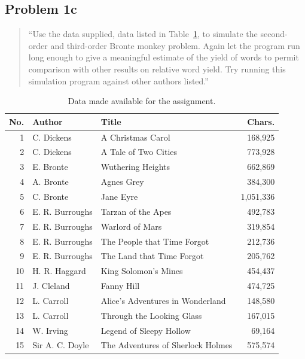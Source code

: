 \documentclass[conference]{IEEEtran}
\begin{document}
\subsection{Problem 1c}
\label{sec:problem1c}

\begin{quote}
``Use the data supplied, data listed in Table~\ref{tab:data}, to simulate the 
second-order and third-order Bronte monkey problem. Again let the program run 
long enough to give a meaningful estimate of the yield of words to permit 
comparison with other results on relative word yield. Try running this 
simulation program against other authors listed.''
\end{quote}

\begin{table}
\caption{Data made available for the assignment.\label{tab:data}}
\vspace{-18pt}
\begin{center}
\begin{tabular}{r@{\hspace{1.1em}}l@{\hspace{1.1em}}l@{\hspace{0.75em}}r}
\hline
No. & Author & Title & Chars. \\
\hline
1  & C. Dickens & A Christmas Carol & 168,925 \\
2  & C. Dickens & A Tale of Two Cities & 773,928 \\
3  & E. Bronte & Wuthering Heights & 662,869 \\
4  & A. Bronte & Agnes Grey & 384,300 \\
5  & C. Bronte & Jane Eyre & 1,051,336 \\
6  & E. R. Burroughs & Tarzan of the Apes & 492,783 \\
7  & E. R. Burroughs & Warlord of Mars & 319,854 \\
8  & E. R. Burroughs & The People that Time Forgot & 212,736 \\
9  & E. R. Burroughs & The Land that Time Forgot & 205,762 \\
10 & H. R. Haggard & King Solomon's Mines & 454,437 \\
11 & J. Cleland & Fanny Hill & 474,725 \\
12 & L. Carroll & Alice's Adventures in Wonderland & 148,580 \\
13 & L. Carroll & Through the Looking Glass & 167,015 \\
14 & W. Irving & Legend of Sleepy Hollow & 69,164 \\
15 & Sir A. C. Doyle & The Adventures of Sherlock Holmes & 575,574 \\

\end{tabular}
\end{center}
\end{table}
\end{document}
